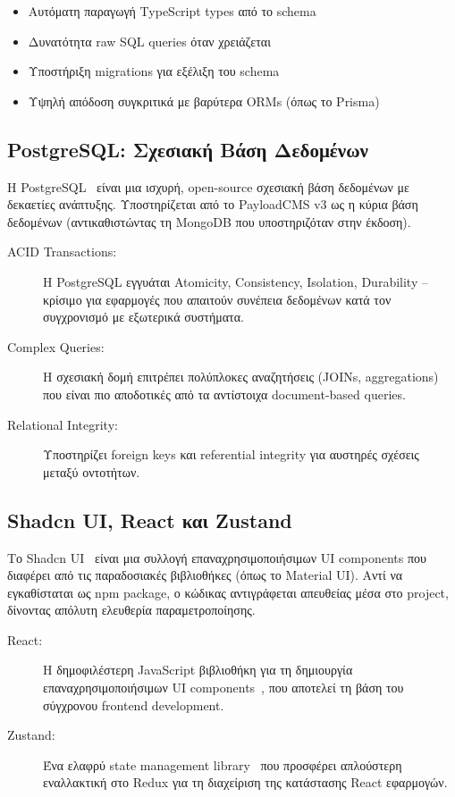 \documentclass[
	12pt, %
	oneside, %
	greek,
	onehalfspacing, %
	liststotoc, %
	toctotoc, %
	parskip, %
	headsepline, %
]{MastersDoctoralThesis} %
\begin{document}
\begin{itemize}
    \item Αυτόματη παραγωγή TypeScript types από το schema
    \item Δυνατότητα raw SQL queries όταν χρειάζεται
    \item Υποστήριξη migrations για εξέλιξη του schema
    \item Υψηλή απόδοση συγκριτικά με βαρύτερα ORMs (όπως το Prisma)
\end{itemize}

\subsection{PostgreSQL: Σχεσιακή Βάση Δεδομένων}
\label{subsec:postgresql}

Η PostgreSQL~\cite{postgresql} είναι μια ισχυρή, open-source σχεσιακή βάση δεδομένων με δεκαετίες ανάπτυξης. Υποστηρίζεται από το PayloadCMS v3 ως η κύρια βάση δεδομένων (αντικαθιστώντας τη MongoDB που υποστηριζόταν στην έκδοση).

\begin{description}
    \item[ACID Transactions:] Η PostgreSQL εγγυάται Atomicity, Consistency, Isolation, Durability -- κρίσιμο για εφαρμογές που απαιτούν συνέπεια δεδομένων κατά τον συγχρονισμό με εξωτερικά συστήματα.
    \item[Complex Queries:] Η σχεσιακή δομή επιτρέπει πολύπλοκες αναζητήσεις (JOINs, aggregations) που είναι πιο αποδοτικές από τα αντίστοιχα document-based queries.
    \item[Relational Integrity:] Υποστηρίζει foreign keys και referential integrity για αυστηρές σχέσεις μεταξύ οντοτήτων.
\end{description}

\subsection{Shadcn UI, React και Zustand}
\label{subsec:shadcn}

Το Shadcn UI~\cite{shadcn} είναι μια συλλογή επαναχρησιμοποιήσιμων UI components που διαφέρει από τις παραδοσιακές βιβλιοθήκες (όπως το Material UI). Αντί να εγκαθίσταται ως npm package, ο κώδικας αντιγράφεται απευθείας μέσα στο project, δίνοντας απόλυτη ελευθερία παραμετροποίησης.

\begin{description}
    \item[React:] Η δημοφιλέστερη JavaScript βιβλιοθήκη για τη δημιουργία επαναχρησιμοποιήσιμων UI components~\cite{react}, που αποτελεί τη βάση του σύγχρονου frontend development.
    \item[Zustand:] Ένα ελαφρύ state management library~\cite{zustand} που προσφέρει απλούστερη εναλλακτική στο Redux για τη διαχείριση της κατάστασης React εφαρμογών.
\end{description}
\end{document}
